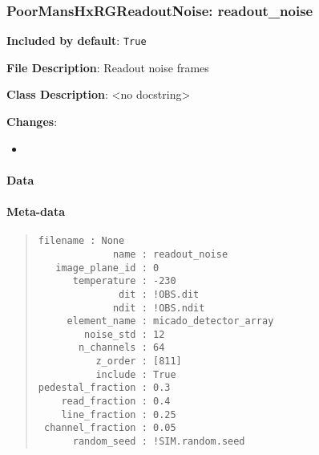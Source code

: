 \subsubsection{PoorMansHxRGReadoutNoise: \textquotedbl{}readout\_noise\textquotedbl{}%
  \label{poormanshxrgreadoutnoise-readout-noise}%
}

\textbf{Included by default}: \texttt{True}

\textbf{File Description}: Readout noise frames

\textbf{Class Description}: <no docstring>

\textbf{Changes}:

\begin{itemize}
\item \end{itemize}


\paragraph{Data%
  \label{id13}%
}


\paragraph{Meta-data%
  \label{id14}%
}

\begin{quote}
\begin{alltt}
\begin{lstlisting}[frame=single]
         filename : None
             name : readout_noise
   image_plane_id : 0
      temperature : -230
              dit : !OBS.dit
             ndit : !OBS.ndit
     element_name : micado_detector_array
        noise_std : 12
       n_channels : 64
          z_order : [811]
          include : True
pedestal_fraction : 0.3
    read_fraction : 0.4
    line_fraction : 0.25
 channel_fraction : 0.05
      random_seed : !SIM.random.seed
\end{lstlisting}
\end{alltt}
\end{quote}
